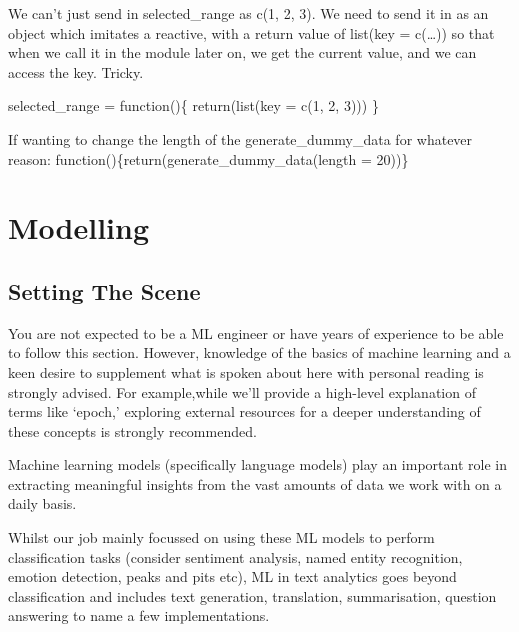 \documentclass[
  letterpaper,
  DIV=11,
  numbers=noendperiod]{scrreprt}
\begin{document}
We can't just send in selected\_range as c(1, 2, 3). We need to send it
in as an object which imitates a reactive, with a return value of
list(key = c(\ldots)) so that when we call it in the module later on, we
get the current value, and we can access the key. Tricky.

selected\_range = function()\{ return(list(key = c(1, 2, 3))) \}

If wanting to change the length of the generate\_dummy\_data for
whatever reason: function()\{return(generate\_dummy\_data(length =
20))\}

\part{Modelling}

\chapter{Setting The Scene}\label{setting-the-scene}

\begin{tcolorbox}[enhanced jigsaw, opacitybacktitle=0.6, breakable, title=\textcolor{quarto-callout-warning-color}{\faExclamationTriangle}\hspace{0.5em}{What you should know}, arc=.35mm, colframe=quarto-callout-warning-color-frame, colbacktitle=quarto-callout-warning-color!10!white, left=2mm, bottomrule=.15mm, opacityback=0, toprule=.15mm, bottomtitle=1mm, toptitle=1mm, titlerule=0mm, leftrule=.75mm, colback=white, rightrule=.15mm, coltitle=black]

You are not expected to be a ML engineer or have years of experience to
be able to follow this section. However, knowledge of the basics of
machine learning and a keen desire to supplement what is spoken about
here with personal reading is strongly advised. For example,while we'll
provide a high-level explanation of terms like `epoch,' exploring
external resources for a deeper understanding of these concepts is
strongly recommended.

\end{tcolorbox}

Machine learning models (specifically language models) play an important
role in extracting meaningful insights from the vast amounts of data we
work with on a daily basis.

Whilst our job mainly focussed on using these ML models to perform
classification tasks (consider sentiment analysis, named entity
recognition, emotion detection, peaks and pits etc), ML in text
analytics goes beyond classification and includes text generation,
translation, summarisation, question answering to name a few
implementations.
\end{document}
